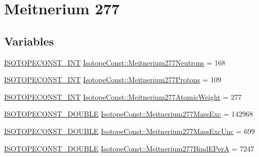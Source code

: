 \hypertarget{group___isotope_const-_meitnerium-_mt277}{}\section{Meitnerium 277}
\label{group___isotope_const-_meitnerium-_mt277}
\subsection*{Variables}
\begin{DoxyCompactItemize}
\item 
\mbox{\hyperlink{group___isotope_const-_macros_ga5f18360b3e99483a35c32d789e62621c}{I\+S\+O\+T\+O\+P\+E\+C\+O\+N\+S\+T\+\_\+\+I\+NT}} \mbox{\hyperlink{group___isotope_const-_meitnerium-_mt277_ga4ed3d1456b2e34e0d5b4c92f30fd8285}{Isotope\+Const\+::\+Meitnerium277\+Neutrons}} = 168
\item 
\mbox{\hyperlink{group___isotope_const-_macros_ga5f18360b3e99483a35c32d789e62621c}{I\+S\+O\+T\+O\+P\+E\+C\+O\+N\+S\+T\+\_\+\+I\+NT}} \mbox{\hyperlink{group___isotope_const-_meitnerium-_mt277_ga14e9500f0b47aef18f8095179adf7988}{Isotope\+Const\+::\+Meitnerium277\+Protons}} = 109
\item 
\mbox{\hyperlink{group___isotope_const-_macros_ga5f18360b3e99483a35c32d789e62621c}{I\+S\+O\+T\+O\+P\+E\+C\+O\+N\+S\+T\+\_\+\+I\+NT}} \mbox{\hyperlink{group___isotope_const-_meitnerium-_mt277_ga3e138e6caa1a0b9a889f2375c9d5e241}{Isotope\+Const\+::\+Meitnerium277\+Atomic\+Weight}} = 277
\item 
\mbox{\hyperlink{group___isotope_const-_macros_ga8f45a7272ce02c0b4c65c44636ed719a}{I\+S\+O\+T\+O\+P\+E\+C\+O\+N\+S\+T\+\_\+\+D\+O\+U\+B\+LE}} \mbox{\hyperlink{group___isotope_const-_meitnerium-_mt277_ga52220ae975ef14a5dbdaed024a88e024}{Isotope\+Const\+::\+Meitnerium277\+Mass\+Exc}} = 142968
\item 
\mbox{\hyperlink{group___isotope_const-_macros_ga8f45a7272ce02c0b4c65c44636ed719a}{I\+S\+O\+T\+O\+P\+E\+C\+O\+N\+S\+T\+\_\+\+D\+O\+U\+B\+LE}} \mbox{\hyperlink{group___isotope_const-_meitnerium-_mt277_ga1ed00fbd4d3d7fa21a35946019124cd2}{Isotope\+Const\+::\+Meitnerium277\+Mass\+Exc\+Unc}} = 699
\item 
\mbox{\hyperlink{group___isotope_const-_macros_ga8f45a7272ce02c0b4c65c44636ed719a}{I\+S\+O\+T\+O\+P\+E\+C\+O\+N\+S\+T\+\_\+\+D\+O\+U\+B\+LE}} \mbox{\hyperlink{group___isotope_const-_meitnerium-_mt277_gae8a8e1b57254229cc175a41dda01320d}{Isotope\+Const\+::\+Meitnerium277\+Bind\+E\+PerA}} = 7247
\item 

\end{DoxyCompactItemize}
